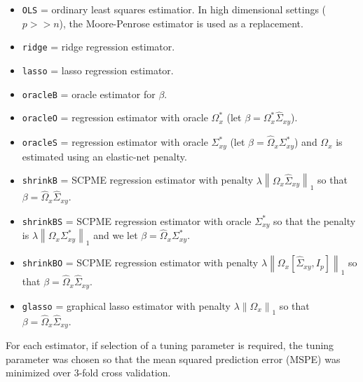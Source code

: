 \documentclass[11pt,]{report}
\theoremstyle{definition}
\theoremstyle{definition}
\theoremstyle{definition}
\theoremstyle{remark}
\begin{document}
\begin{itemize}
\item
  \texttt{OLS} = ordinary least squares estimatior. In high dimensional settings (\(p >> n\)), the Moore-Penrose estimator is used as a replacement.
\item
  \texttt{ridge} = ridge regression estimator.
\item
  \texttt{lasso} = lasso regression estimator.
\item
  \texttt{oracleB} = oracle estimator for \(\beta\).
\item
  \texttt{oracleO} = regression estimator with oracle \(\Omega_{x}^{*}\) (let \(\beta = \Omega_{x}^{*}\hat{\Sigma}_{xy}\)).
\item
  \texttt{oracleS} = regression estimator with oracle \(\Sigma_{xy}^{*}\) (let \(\beta = \hat{\Omega}_{x}\Sigma_{xy}^{*}\)) and \(\Omega_{x}\) is estimated using an elastic-net penalty.
\item
  \texttt{shrinkB} = SCPME regression estimator with penalty \(\lambda\left\| \Omega_{x}\hat{\Sigma}_{xy} \right\|_{1}\) so that \(\beta = \hat{\Omega}_{x}\hat{\Sigma}_{xy}\).
\item
  \texttt{shrinkBS} = SCPME regression estimator with oracle \(\Sigma_{xy}^{*}\) so that the penalty is \(\lambda\left\| \Omega_{x}\Sigma_{xy}^{*} \right\|_{1}\) and we let \(\beta = \hat{\Omega}_{x}\Sigma_{xy}^{*}\).
\item
  \texttt{shrinkBO} = SCPME regression estimator with penalty \(\lambda\left\| \Omega_{x}[\hat{\Sigma}_{xy}, I_{p}] \right\|_{1}\) so that \(\beta = \hat{\Omega}_{x}\hat{\Sigma}_{xy}\).
\item
  \texttt{glasso} = graphical lasso estimator with penalty \(\lambda\left\| \Omega_{x} \right\|_{1}\) so that \(\beta = \hat{\Omega}_{x}\hat{\Sigma}_{xy}\).
\end{itemize}

For each estimator, if selection of a tuning parameter is required, the tuning parameter was chosen so that the mean squared prediction error (MSPE) was minimized over 3-fold cross validation.
\end{document}
